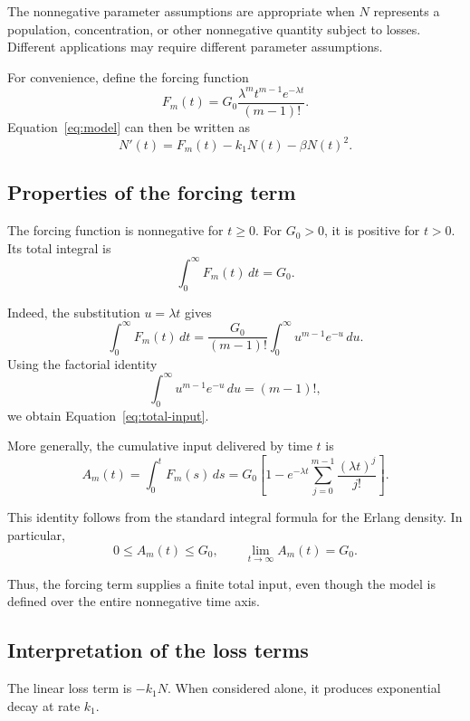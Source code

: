 \documentclass[12pt]{article}
\theoremstyle{definition}
\theoremstyle{remark}
\begin{document}
The nonnegative parameter assumptions are appropriate
when \(N\) represents a population, concentration, or
other nonnegative quantity subject to losses. Different
applications may require different parameter assumptions.

For convenience, define the forcing function
\begin{equation}
F_m(t)
=
G_0\frac{\lambda^m t^{m-1}e^{-\lambda t}}{(m-1)!}.
\label{eq:forcing}
\end{equation}
Equation~\eqref{eq:model} can then be written as
\begin{equation}
N'(t)=F_m(t)-k_1N(t)-\beta N(t)^2.
\label{eq:compact-model}
\end{equation}

\subsection{Properties of the forcing term}

The forcing function is nonnegative for \(t\geq 0\).
For \(G_0>0\), it is positive for \(t>0\). Its total
integral is
\begin{equation}
\int_0^\infty F_m(t)\,dt=G_0.
\label{eq:total-input}
\end{equation}

Indeed, the substitution \(u=\lambda t\) gives
\[
\int_0^\infty F_m(t)\,dt
=
\frac{G_0}{(m-1)!}
\int_0^\infty u^{m-1}e^{-u}\,du.
\]
Using the factorial identity
\[
\int_0^\infty u^{m-1}e^{-u}\,du=(m-1)!,
\]
we obtain Equation~\eqref{eq:total-input}.

More generally, the cumulative input delivered by time
\(t\) is
\begin{equation}
A_m(t)
=
\int_0^t F_m(s)\,ds
=
G_0\left[
1-e^{-\lambda t}
\sum_{j=0}^{m-1}\frac{(\lambda t)^j}{j!}
\right].
\label{eq:cumulative-input}
\end{equation}

This identity follows from the standard integral formula
for the Erlang density. In particular,
\[
0\leq A_m(t)\leq G_0,
\qquad
\lim_{t\to\infty}A_m(t)=G_0.
\]

Thus, the forcing term supplies a finite total input,
even though the model is defined over the entire
nonnegative time axis.

\subsection{Interpretation of the loss terms}

The linear loss term is \(-k_1N\). When considered alone,
it produces exponential decay at rate \(k_1\).
\end{document}
